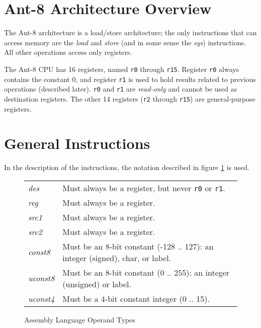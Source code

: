 
\section{{\sc Ant-8}  Architecture Overview}

The Ant-8 architecture is a load/store architecture;
the only instructions that can access memory
are the {\em load} and {\em store} (and in some sense
the {\em sys}) instructions.
All other operations access only registers.

The Ant-8 CPU has 16 registers, named {\tt r0} through {\tt r15}.
Register {\tt r0} always contains the constant 0, and register
{\tt r1} is used to hold results related to previous operations
(described later).  {\tt r0} and {\tt r1} are {\em read-only}
and cannot be used as destination registers.
The other 14 registers ({\tt r2} through {\tt r15}) are
general-purpose registers.

\section{General Instructions}
\label{mnemonic-sec}

In the description of the instructions, the notation described in
figure \ref{operand-table} is used.

\begin{figure}
\caption{ \label{operand-table} Assembly Language Operand Types}
\vspace{3mm}
\begin{center}
\begin{tabular}{|lp{4.5in}|}
\hline
{\em des}       & Must always be a register, but never {\tt r0} or {\tt r1}. \\
{\em reg}       & Must always be a register. \\
{\em src1}      & Must always be a register. \\
{\em src2}      & Must always be a register. \\
{\em const8}     & Must be an 8-bit constant (-128 .. 127):
			an integer (signed), char, or label. \\
{\em uconst8}	& Must be an 8-bit constant (0 .. 255):
			an integer (unsigned) or label. \\
{\em uconst4}	& Must be a 4-bit constant integer (0 .. 15). \\
\hline
\end{tabular}
\end{center}
\vspace{3mm}
\end{figure}

